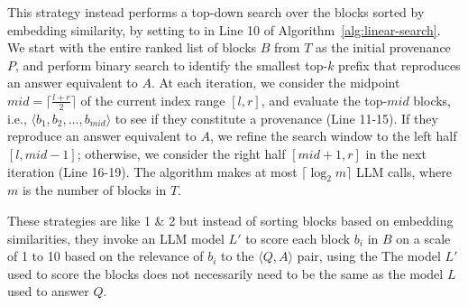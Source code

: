  This strategy instead  performs a top-down search over the blocks sorted by embedding similarity, by setting  to  in Line 10 of Algorithm~\ref{alg:linear-search}. 
We start with the entire ranked list of blocks $B$ from $T$ as the initial provenance $P$, and perform binary search to identify the smallest top-$k$ prefix that reproduces an answer equivalent to $A$. At each iteration, we consider the midpoint $mid = \lceil \frac{l + r}{2} \rceil$ of the current index range $[l, r]$, and evaluate the top-$mid$ blocks, i.e., $⟨b_1, b_2, \dots, b_{mid}⟩$ to see if they constitute a provenance (Line 11-15). If they reproduce an answer equivalent to $A$, we refine the search window to the left half $[l, mid - 1]$; otherwise, we consider the right half $[mid + 1, r]$ in the next iteration (Line 16-19).  
 The algorithm makes at most $\lceil \log_2 m \rceil$ LLM calls, where $m$ is the number of blocks in $T$.  

\vspace{1pt}
 These strategies are like 1 \& 2 but instead of sorting blocks based on embedding similarities, they invoke an LLM model $L'$ to score each block $b_i$ in $B$ on a  scale of 1 to 10 based on the relevance of $b_i$ to the $\langle Q,A\rangle$ pair, using the   The model $L'$ used to score the blocks does not necessarily need to be the same as the model $L$ used to answer $Q$. %





